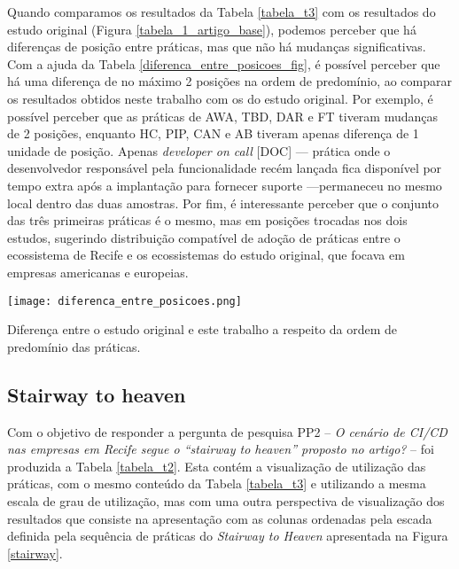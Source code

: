 Quando comparamos os resultados da Tabela \ref{tabela_t3} com os resultados do estudo original (Figura \ref{tabela_1_artigo_base}), podemos perceber que há diferenças de posição entre práticas, mas que não há mudanças significativas. Com a ajuda da Tabela \ref{diferenca_entre_posicoes_fig}, é possível perceber que há uma diferença de no máximo 2 posições na ordem de predomínio, ao comparar os resultados obtidos neste trabalho com os do estudo original. Por exemplo, é possível perceber que as práticas de AWA, TBD, DAR e FT tiveram mudanças de 2 posições, enquanto HC, PIP, CAN e AB tiveram apenas diferença de 1 unidade de posição. Apenas \emph{developer on call} [DOC] --- prática onde o desenvolvedor responsável pela funcionalidade recém lançada fica disponível por tempo extra após a implantação para fornecer suporte ---permaneceu no mesmo local dentro das duas amostras. Por fim, é interessante perceber que o conjunto das três primeiras práticas é o mesmo, mas em posições trocadas nos dois estudos, sugerindo distribuição compatível de adoção de práticas entre o ecossistema de Recife e os ecossistemas do estudo original, que focava em empresas americanas e europeias.

\begin{table}[ht]
\begin{center}
\texttt{[image: diferenca\_entre\_posicoes.png]}
\end{center}
\caption[Diferença entre a ordem de predomínio das práticas]{
    Diferença entre o estudo original e este trabalho a respeito da ordem de predomínio das práticas.
}\label{diferenca_entre_posicoes_fig}
\end{table}

\subsection{Stairway to heaven}

Com o objetivo de responder a pergunta de pesquisa PP2 -- \emph{O cenário de CI/CD nas empresas em Recife segue o ``stairway to heaven'' proposto no artigo?} -- foi produzida a Tabela \ref{tabela_t2}. Esta contém a visualização de utilização das práticas, com o mesmo conteúdo da Tabela \ref{tabela_t3} e utilizando a mesma escala de grau de utilização, mas com uma outra perspectiva de visualização dos resultados que consiste na apresentação com as colunas ordenadas pela escada definida pela sequência de práticas do \emph{Stairway to Heaven} apresentada na Figura \ref{stairway}.


